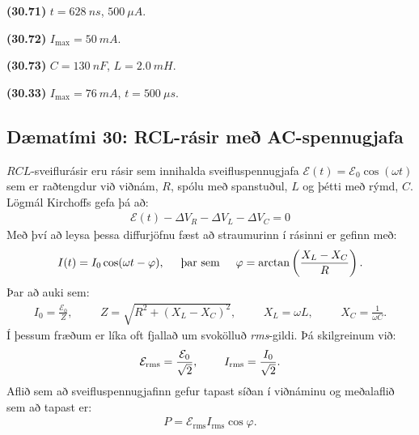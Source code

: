 \ifdefined \wholebook \else\documentclass[oneside]{book}\usepackage{EdlBook}\graphicspath{{figures/}}
\begin{document}
\begin{tcolorbox}
\begin{enumerate*}[label = ]
  \item \textbf{(30.71)} $t = \SI{628}{ns}$, $\SI{500}{\mu A}$.
  \item \textbf{(30.72)} $I_{\text{max}} = \SI{50}{mA}$.
  \item \textbf{(30.73)} $C = \SI{130}{nF}$, $L = \SI{2.0}{mH}$. \\
  \item \textbf{(30.33)} $I_{\text{max}} = \SI{76}{mA}$, $t = \SI{500}{\mu s}$.
\end{enumerate*}
\end{tcolorbox}

\newpage

\subsection*{Dæmatími 30: RCL-rásir með AC-spennugjafa}

\begin{tcolorbox}
$RCL$-sveiflurásir eru rásir sem innihalda sveifluspennugjafa $\mathcal{E}(t) = \mathcal{E}_0\cos(\omega t)$ sem er raðtengdur við viðnám, $R$, spólu með spanstuðul, $L$ og þétti með rýmd, $C$. Lögmál Kirchoffs gefa þá að:
\begin{align*}
    \mathcal{E}(t) - \Delta V_R - \Delta V_L - \Delta V_C = 0
\end{align*}
Með því að leysa þessa diffurjöfnu fæst að straumurinn í rásinni er gefinn með:
\begin{align*}
    I(t) = I_0 \cos(\omega t - \varphi), \hspace{0.5cm} \text{þar sem} \hspace{0.5cm} \varphi = \arctan\left(\frac{X_L-X_C}{R}\right).
\end{align*}
Þar að auki sem:
\begin{align*}
    I_0 = \frac{\mathcal{E}_0}{Z}, \hspace{1cm} Z = \sqrt{R^2 + (X_L - X_C)^2}, \hspace{1cm} X_L = \omega L, \hspace{1cm} X_C = \frac{1}{\omega C}.
\end{align*}
Í þessum fræðum er líka oft fjallað um svokölluð \emph{rms}-gildi. Þá skilgreinum við:
\begin{align*}
    \mathcal{E}_{\text{rms}} = \frac{\mathcal{E}_0}{\sqrt{2}}, \hspace{0.8cm} I_{\text{rms}} = \frac{I_0}{\sqrt{2}}.
\end{align*}
Aflið sem að sveifluspennugjafinn gefur tapast síðan í viðnáminu og meðalaflið sem að tapast er:
\begin{align*}
    P = \mathcal{E}_{\text{rms}} I_{\text{rms}} \cos\varphi.
\end{align*}
\end{tcolorbox}
\end{document}
